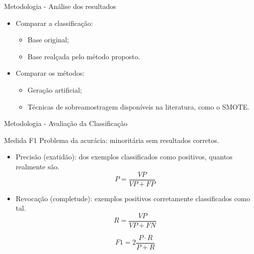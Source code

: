 \documentclass{beamer}
\begin{document}
\begin{frame}{Metodologia - Análise dos resultados}
\setlength\leftmargini{1em}
\begin{block}{}
\justifying
\begin{itemize}
\item Comparar a classificação:
\begin{itemize}
\item Base original;
\item Base realçada pelo método proposto.
\end{itemize}
\item Comparar os métodos:
\begin{itemize}
\item Geração artificial;
\item Técnicas de sobreamostragem disponíveis na literatura, como o SMOTE.
\end{itemize}
\end{itemize}
\end{block}
\end{frame}
\begin{frame}{Metodologia - Avaliação da Classificação}
\setlength\leftmargini{1em}
\begin{block}{Medida F1}
\justifying
Problema da acurácia: minoritária sem resultados corretos. \\
\begin{itemize}

\item Precisão (exatidão): dos exemplos classificados como positivos, quantos realmente são.
\vspace{-1.5em}
\begin{equation*}
  P = \frac{VP}{VP + FP}
\end{equation*}
\item Revocação (completude): exemplos positivos corretamente classificados como tal.
\begin{equation*}
  R = \frac{VP}{VP + FN}
\end{equation*}

\pause
\begin{equation*}
  F1 = 2 \frac{P \cdot R}{P+R}
\end{equation*}
\end{itemize}
\end{block}
\end{frame}
\end{document}
